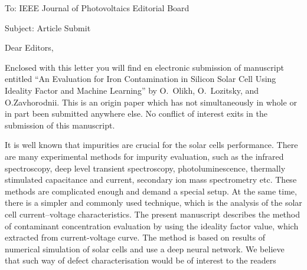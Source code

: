 \documentclass[preprint]{elsarticle}
\begin{document}
To:
IEEE Journal of Photovoltaics Editorial Board


Subject:
Article Submit

\vspace{5mm}
Dear Editors,

\vspace{3mm}
Enclosed with this letter you will find en electronic submission of manuscript entitled ``An Evaluation for Iron Contamination in Silicon Solar Cell Using Ideality Factor and Machine Learning'' by O.~Olikh, O.~Lozitsky, and O.Zavhorodnii.
This is an origin paper which has not
simultaneously in whole or in part been submitted anywhere else.
No conflict of interest exits in the submission of this manuscript.


It is well known that impurities are crucial for the solar cells performance.
There are many experimental methods for impurity evaluation, such as the infrared spectroscopy, deep level transient spectroscopy, photoluminescence, thermally stimulated capacitance and current, secondary ion mass spectrometry etc. 
These methods are complicated enough and demand a special setup. 
At the same time, there is a simpler and commonly used technique, which
is the analysis of the solar cell current--voltage characteristics. 
The present manuscript describes the method of contaminant concentration evaluation by
using the ideality factor value, which extracted from current-voltage curve. 
The method is based on results of numerical simulation of solar cells and use a deep neural network. 
We believe that such way of defect characterisation would be of interest to the readers

\end{document}
